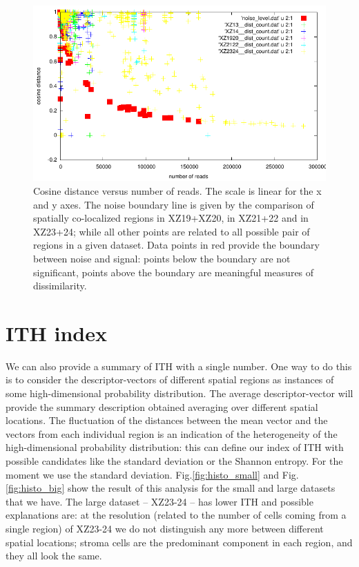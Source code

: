 \documentclass[11pt,a4paper]{article}
\begin{document}
\begin{figure}[hbtp]
\centering
\includegraphics[scale=1]{intra_tumor_heterog__q10_res100k.pdf}
\caption{Cosine distance versus number of reads. The scale is linear for the x and y axes. The noise boundary line is given by the comparison of spatially co-localized regions in XZ19+XZ20, in XZ21+22 and in XZ23+24; while all other points are related to all possible pair of regions in a given dataset. Data points in red provide the boundary between noise and signal: points below the boundary are not significant, points above the boundary are meaningful measures of dissimilarity. }
\label{fig:intra_tumor_heterog__q10_res100k}
\end{figure}

\section{ITH index}
We can also provide a summary of ITH with a single number. One way to do this is to consider the descriptor-vectors of  different spatial regions as instances of some high-dimensional probability distribution. The average descriptor-vector will provide the summary description obtained averaging over different spatial locations. The fluctuation of the distances between the mean vector and the vectors from each individual region is an indication of the heterogeneity of the high-dimensional probability distribution: this can define our index of ITH with possible candidates like the standard deviation or the Shannon entropy. For the moment we use the standard deviation. Fig.\ref{fig:histo_small} and Fig.\ref{fig:histo_big} show the result of this analysis for the small and large datasets that we have. The large dataset -- XZ23-24 -- has lower ITH and possible explanations are: at the resolution (related to the number of cells coming from a single region) of XZ23-24 we do not distinguish any more between different spatial locations; stroma cells are the predominant component in each region, and they all look the same. 
		
\end{document}

